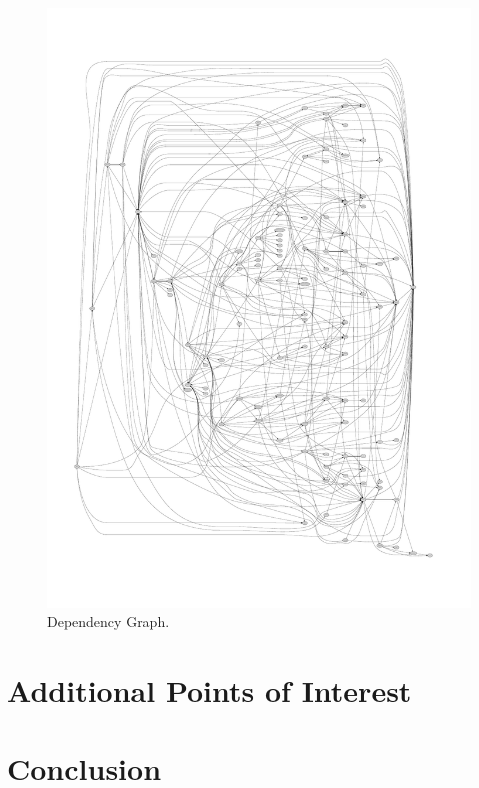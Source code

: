 \documentclass[10.5pt,journal, a4paper]{IEEEtran}
\begin{document}
\begin{figure}[]
 \centering 
 \includegraphics[width=\columnwidth]{freevo19less}
 \centering 
  \caption {Dependency Graph. }
 \end{figure}



\section{Additional Points of Interest}



\section{Conclusion}

\end{document}
